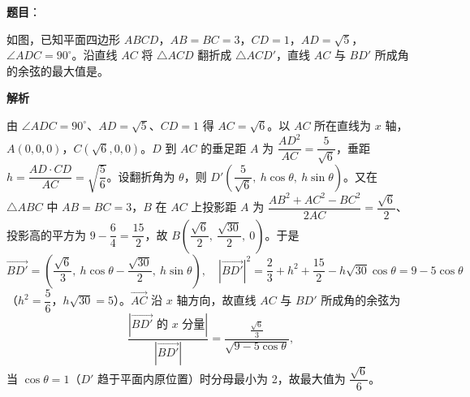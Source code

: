 \begin{answer}

\textbf{题目}：

如图，已知平面四边形 \(ABCD\)，\(AB=BC=3\)，\(CD=1\)，\(AD=\sqrt{5}\)，\(\angle ADC=90^{\circ}\)。沿直线 \(AC\) 将 \(\triangle ACD\) 翻折成 \(\triangle ACD'\)，直线 \(AC\) 与 \(BD'\) 所成角的余弦的最大值是\gkblank{}。
\nopagebreak[4]
\begin{center}\end{center}
\nopagebreak[4]
\textbf{解析}

由 \(\angle ADC=90^{\circ}\)、\(AD=\sqrt{5}\)、\(CD=1\) 得 \(AC=\sqrt{6}\)。以 \(AC\) 所在直线为 \(x\) 轴，\(A(0,0,0)\)，\(C(\sqrt{6},0,0)\)。\(D\) 到 \(AC\) 的垂足距 \(A\) 为 \(\dfrac{AD^{2}}{AC}=\dfrac{5}{\sqrt{6}}\)，垂距 \(h=\dfrac{AD\cdot CD}{AC}=\sqrt{\dfrac{5}{6}}\)。设翻折角为 \(\theta\)，则 \(D'\left(\dfrac{5}{\sqrt{6}},\ h\cos\theta,\ h\sin\theta\right)\)。又在 \(\triangle ABC\) 中 \(AB=BC=3\)，\(B\) 在 \(AC\) 上投影距 \(A\) 为 \(\dfrac{AB^{2}+AC^{2}-BC^{2}}{2AC}=\dfrac{\sqrt{6}}{2}\)、投影高的平方为 \(9-\dfrac{6}{4}=\dfrac{15}{2}\)，故 \(B\left(\dfrac{\sqrt{6}}{2},\ \dfrac{\sqrt{30}}{2},\ 0\right)\)。于是
\nopagebreak[4]
\[
\overrightarrow{BD'}=\left(\frac{\sqrt{6}}{3},\ h\cos\theta-\frac{\sqrt{30}}{2},\ h\sin\theta\right),
\quad |\overrightarrow{BD'}|^{2}=\frac{2}{3}+h^{2}+\frac{15}{2}-h\sqrt{30}\cos\theta=9-5\cos\theta
\]
（\(h^{2}=\dfrac{5}{6}\)，\(h\sqrt{30}=5\)）。\(\overrightarrow{AC}\) 沿 \(x\) 轴方向，故直线 \(AC\) 与 \(BD'\) 所成角的余弦为
\nopagebreak[4]
\[
\frac{\left|\overrightarrow{BD'}\text{ 的 }x\text{ 分量}\right|}{|\overrightarrow{BD'}|}=\frac{\frac{\sqrt{6}}{3}}{\sqrt{9-5\cos\theta}},
\]
当 \(\cos\theta=1\)（\(D'\) 趋于平面内原位置）时分母最小为 2，故最大值为 \(\dfrac{\sqrt{6}}{6}\)。


\end{answer}
